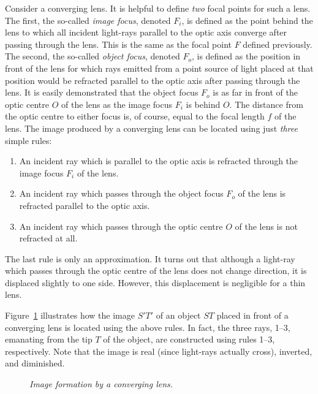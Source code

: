 Consider a converging lens. It is helpful to define {\em two}\/
focal points for such a lens. The first, the so-called {\em image
focus}, denoted $F_i$, is defined as the point behind the
lens to which all incident light-rays parallel to the optic
axis converge after passing through the lens.
 This is the same as the focal point $F$ defined
previously. The second, the so-called {\em object
focus}, denoted $F_o$,  is defined as the position in front of
the lens for  which rays emitted from a point source of light placed at
that position 
would be refracted parallel to the optic axis after passing through
the lens. It is easily demonstrated that the object focus $F_o$
is as far in front of the optic centre $O$ of the lens as the image focus
$F_i$ is behind $O$. The distance from the optic centre to either
focus is, of course, equal to the focal length
$f$ of the lens. The image produced by a converging lens can be
located using just {\em three}\/ simple rules:
\begin{enumerate}
\item An incident ray which is parallel to the optic axis is
refracted through the image focus $F_i$ of the lens.
\item An incident ray which passes through the object focus
$F_o$ of the lens is refracted parallel to the optic axis.
\item An incident ray which passes through the optic
centre $O$ of the lens is not refracted at all.
\end{enumerate}
The last rule is only an approximation. It turns out that although
a light-ray which passes through the optic centre of the
lens does not change direction, it is displaced slightly to one
side. However, this displacement is negligible for a thin lens. 

Figure~\ref{f13.13} illustrates how the image $S'T'$ of an object $ST$
placed in front of a converging lens
is located using the above rules. 
In fact, the three rays, 1--3, emanating from
the tip $T$ of the object, are constructed using rules 1--3, respectively. 
Note that the image is real (since light-rays actually cross), inverted, and
diminished. 

\begin{figure}[h]
\epsfysize=2.5in
\centerline{}
\caption{\em Image formation by a converging lens.}\label{f13.13}
\end{figure}

